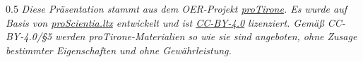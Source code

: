 %

\vspace{1cm}
\begin{spacing}{0.5}
\textrm{\textit{\tiny{Diese Präsentation stammt aus dem OER-Projekt
\href{https://github.com/protirone/protico.ltx}{proTirone}. Es wurde auf
Basis von \href{https://github.com/kreincke/proScientia.ltx}{proScientia.ltx}
entwickelt und ist \textit{\href{https://creativecommons.org/licenses/by/4.0/}{CC-BY-4.0}}
lizenziert. Gemäß CC-BY-4.0/§5 werden proTirone-Materialien so wie sie sind
angeboten, ohne Zusage bestimmter Eigenschaften und ohne Gewährleistung.
}}}
\end{spacing}

